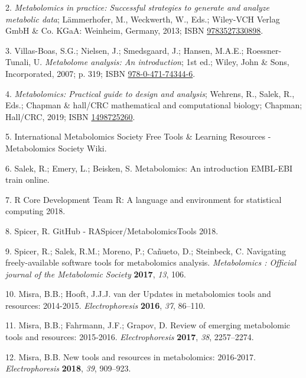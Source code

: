 \documentclass[]{article}
\begin{document}
\leavevmode\hypertarget{ref-lammerhofer_2013}{}%
2. \emph{Metabolomics in practice: Successful strategies to generate and analyze metabolic data}; Lämmerhofer, M., Weckwerth, W., Eds.; Wiley-VCH Verlag GmbH \& Co. KGaA: Weinheim, Germany, 2013; ISBN \href{https://worldcat.org/isbn/9783527330898}{9783527330898}.

\leavevmode\hypertarget{ref-villasboas_2007}{}%
3. Villas-Boas, S.G.; Nielsen, J.; Smedsgaard, J.; Hansen, M.A.E.; Roessner-Tunali, U. \emph{Metabolome analysis: An introduction}; 1st ed.; Wiley, John \& Sons, Incorporated, 2007; p. 319; ISBN \href{https://worldcat.org/isbn/978-0-471-74344-6}{978-0-471-74344-6}.

\leavevmode\hypertarget{ref-wehrens_2019}{}%
4. \emph{Metabolomics: Practical guide to design and analysis}; Wehrens, R., Salek, R., Eds.; Chapman \& hall/CRC mathematical and computational biology; Chapman; Hall/CRC, 2019; ISBN \href{https://worldcat.org/isbn/1498725260}{1498725260}.

\leavevmode\hypertarget{ref-InternationalMetabolomicsSociety_2019}{}%
5. International Metabolomics Society Free Tools \& Learning Resources - Metabolomics Society Wiki.

\leavevmode\hypertarget{ref-salek_website_nd}{}%
6. Salek, R.; Emery, L.; Beisken, S. Metabolomics: An introduction EMBL-EBI train online.

\leavevmode\hypertarget{ref-rcoredevelopmentteam_website_2018}{}%
7. R Core Development Team R: A language and environment for statistical computing 2018.

\leavevmode\hypertarget{ref-spicer_website_2018}{}%
8. Spicer, R. GitHub - RASpicer/MetabolomicsTools 2018.

\leavevmode\hypertarget{ref-spicer_2017}{}%
9. Spicer, R.; Salek, R.M.; Moreno, P.; Cañueto, D.; Steinbeck, C. Navigating freely-available software tools for metabolomics analysis. \emph{Metabolomics : Official journal of the Metabolomic Society} \textbf{2017}, \emph{13}, 106.

\leavevmode\hypertarget{ref-misra_2016}{}%
10. Misra, B.B.; Hooft, J.J.J. van der Updates in metabolomics tools and resources: 2014-2015. \emph{Electrophoresis} \textbf{2016}, \emph{37}, 86--110.

\leavevmode\hypertarget{ref-misra_2017}{}%
11. Misra, B.B.; Fahrmann, J.F.; Grapov, D. Review of emerging metabolomic tools and resources: 2015-2016. \emph{Electrophoresis} \textbf{2017}, \emph{38}, 2257--2274.

\leavevmode\hypertarget{ref-misra_2018}{}%
12. Misra, B.B. New tools and resources in metabolomics: 2016-2017. \emph{Electrophoresis} \textbf{2018}, \emph{39}, 909--923.
\end{document}
